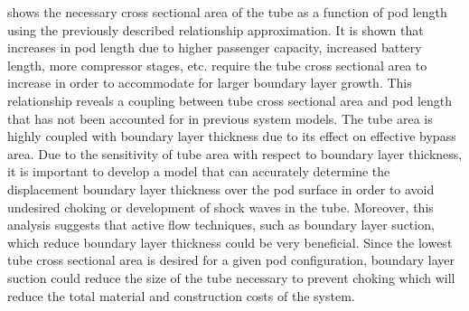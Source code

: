  shows the necessary cross sectional area of the tube as a function of pod length using the previously described relationship approximation. It is shown that increases in pod length due to higher passenger capacity, increased battery length, more compressor stages, etc. require the tube cross sectional area to increase in order to accommodate for larger boundary layer growth. This relationship reveals a coupling between tube cross sectional area and pod length that has not been accounted for in previous system models.
The tube area is highly coupled with boundary layer thickness due to its effect on effective bypass area. Due to the sensitivity of tube area with respect to boundary layer thickness, it is important to develop a model that can accurately determine the displacement boundary layer thickness over the pod surface in order to avoid undesired choking or development of shock waves in the tube. Moreover, this analysis suggests that active flow techniques, such as boundary layer suction, which reduce boundary layer thickness could be very beneficial. Since the lowest tube cross sectional area is desired for a given pod configuration, boundary layer suction could reduce the size of the tube necessary to prevent choking which will reduce the total material and construction costs of the system.
